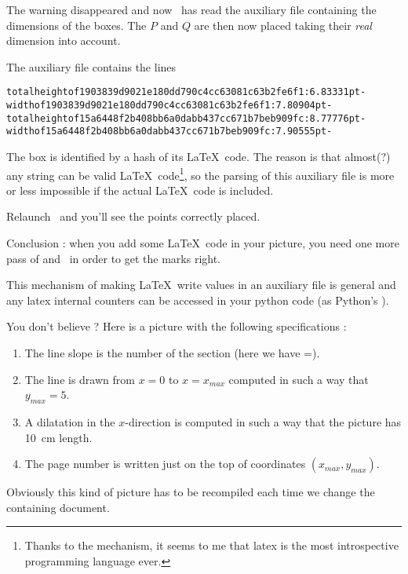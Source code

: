 The warning disappeared and now \phystricks\ has read the auxiliary file containing the dimensions of the boxes. The \( P\) and \( Q\) are then now placed taking their \emph{real} dimension into account.

The auxiliary file contains the lines
\begin{verbatim}
totalheightof1903839d9021e180dd790c4cc63081c63b2fe6f1:6.83331pt-
widthof1903839d9021e180dd790c4cc63081c63b2fe6f1:7.80904pt-
totalheightof15a6448f2b408bb6a0dabb437cc671b7beb909fc:8.77776pt-
widthof15a6448f2b408bb6a0dabb437cc671b7beb909fc:7.90555pt-
\end{verbatim}

The box is identified by a hash of its \LaTeX\ code. The reason is that almost(?) any string can be valid \LaTeX\ code\footnote{Thanks to the  mechanism, it seems to me that latex is the most introspective programming language ever.}, so the parsing of this auxiliary file is more or less impossible if the actual \LaTeX\ code is included.

Relaunch \pdfLaTeX\ and you'll see the points correctly placed.

Conclusion : when you add some \LaTeX\ code in your picture, you need one more pass of \pdfLaTeX and \phystricks\ in order to get the marks right.

This mechanism of making \LaTeX\ write values in an auxiliary file is general and any latex internal counters can be accessed in your python code (as Python's ).

You don't believe ? Here is a picture with the following specifications :
\begin{enumerate}
    \item
        The line slope is the number of the section (here we have \info{\thesection}=\thesection).
\item
The line is drawn from \( x=0\) to \( x=x_{max}\) computed in such a way that \( y_{max}=5\). 
\item
A dilatation in the \( x\)-direction is computed in such a way that the picture has \SI{10}{\centi\meter} length.
\item
    The page number is written just on the top of coordinates \( (x_{max},y_{max})\).
\end{enumerate}

\begin{center}
   
\end{center}

Obviously this kind of picture has to be recompiled each time we change the containing document.

